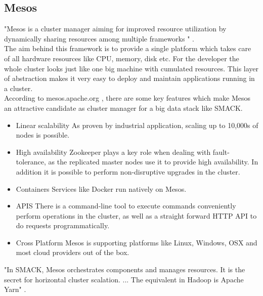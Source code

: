 \subsection{Mesos}
"Mesos is a cluster manager aiming for improved resource utilization by dynamically sharing resources among multiple frameworks " \cite{kakadia2015apache}.\\
The aim behind this framework is to provide a single platform which takes care of all hardware resources like CPU, memory, disk etc.
For the developer the whole cluster looks just like one big machine with cumulated resources.
This layer of abstraction makes it very easy to deploy and maintain applications running in a cluster.\\

According to mesos.apache.org \cite{apache_mesos}, there are some key features which make Mesos an attractive candidate as cluster manager for a big data stack like SMACK.
\begin{itemize}
    \item Linear scalability
        As proven by industrial application, scaling up to 10,000s of nodes is possible.
    \item High availability
        Zookeeper plays a key role when dealing with fault-tolerance, as the replicated master nodes use it to provide high availability.
        In addition it is possible to perform non-disruptive upgrades in the cluster.
    \item Containers
        Services like Docker run natively on Mesos.
    \item APIS
        There is a command-line tool to execute commands conveniently perform operations in the cluster, as well as a straight forward HTTP API to do requests programmatically.
    \item Cross Platform
        Mesos is supporting platforms like Linux, Windows, OSX and most cloud providers out of the box.
\end{itemize}

"In SMACK, Mesos orchestrates components and manages resources.
It is the secret for horizontal cluster scalation. ...
The equivalent in Hadoop is Apache Yarn" \cite{estrada2016big}.


